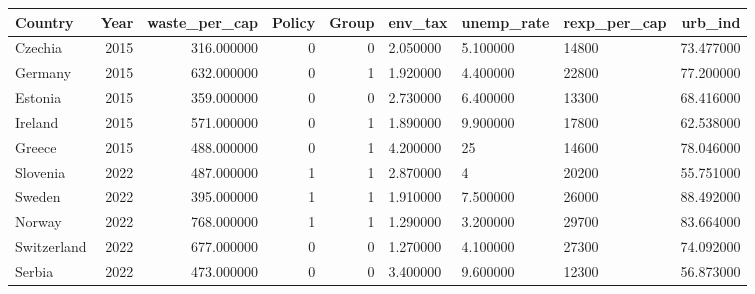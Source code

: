 \begin{tabular}{lrrrrlllr}
\toprule
Country & Year & waste_per_cap & Policy & Group & env_tax & unemp_rate & rexp_per_cap & urb_ind \\
\midrule
Czechia & 2015 & 316.000000 & 0 & 0 & 2.050000 & 5.100000 & 14800 & 73.477000 \\
Germany & 2015 & 632.000000 & 0 & 1 & 1.920000 & 4.400000 & 22800 & 77.200000 \\
Estonia & 2015 & 359.000000 & 0 & 0 & 2.730000 & 6.400000 & 13300 & 68.416000 \\
Ireland & 2015 & 571.000000 & 0 & 1 & 1.890000 & 9.900000 & 17800 & 62.538000 \\
Greece & 2015 & 488.000000 & 0 & 1 & 4.200000 & 25 & 14600 & 78.046000 \\
Slovenia & 2022 & 487.000000 & 1 & 1 & 2.870000 & 4 & 20200 & 55.751000 \\
Sweden & 2022 & 395.000000 & 1 & 1 & 1.910000 & 7.500000 & 26000 & 88.492000 \\
Norway & 2022 & 768.000000 & 1 & 1 & 1.290000 & 3.200000 & 29700 & 83.664000 \\
Switzerland & 2022 & 677.000000 & 0 & 0 & 1.270000 & 4.100000 & 27300 & 74.092000 \\
Serbia & 2022 & 473.000000 & 0 & 0 & 3.400000 & 9.600000 & 12300 & 56.873000 \\
\bottomrule
\end{tabular}
